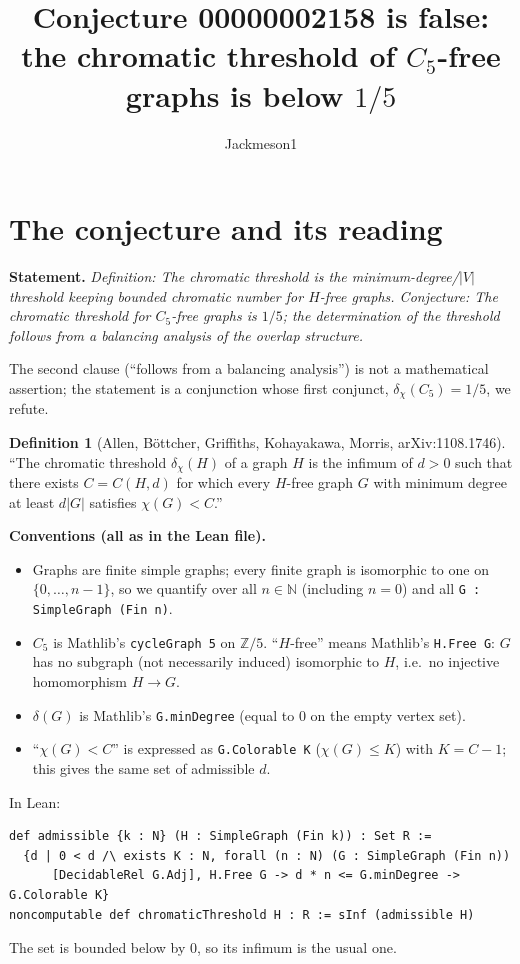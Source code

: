 \documentclass[11pt]{article}
\title{Conjecture 00000002158 is false:\\ the chromatic threshold of $C_5$-free graphs is below $1/5$}
\author{Jackmeson1}
\date{}
\theoremstyle{definition}
\newtheorem{definition}[theorem]{Definition}
\theoremstyle{remark}
\begin{document}
\maketitle

\section{The conjecture and its reading}

\textbf{Statement.} \emph{Definition: The chromatic threshold is the minimum-degree/$|V|$ threshold keeping bounded
chromatic number for $H$-free graphs. Conjecture: The chromatic threshold for $C_5$-free graphs is $1/5$; the
determination of the threshold follows from a balancing analysis of the overlap structure.}

The second clause (``follows from a balancing analysis'') is not a mathematical assertion; the statement is a
conjunction whose first conjunct, $\delta_\chi(C_5)=1/5$, we refute.

\begin{definition}[Allen, B\"ottcher, Griffiths, Kohayakawa, Morris, arXiv:1108.1746]
``The chromatic threshold $\delta_\chi(H)$ of a graph $H$ is the infimum of $d>0$ such that there exists $C=C(H,d)$
for which every $H$-free graph $G$ with minimum degree at least $d|G|$ satisfies $\chi(G)<C$.''
\end{definition}

\textbf{Conventions (all as in the Lean file).}
\begin{itemize}
\item Graphs are finite simple graphs; every finite graph is isomorphic to one on $\{0,\dots,n-1\}$, so we quantify
  over all $n\in\mathbb{N}$ (including $n=0$) and all \texttt{G : SimpleGraph (Fin n)}.
\item $C_5$ is Mathlib's \texttt{cycleGraph 5} on $\mathbb{Z}/5$. ``$H$-free'' means Mathlib's \texttt{H.Free G}:
  $G$ has no subgraph (not necessarily induced) isomorphic to $H$, i.e.\ no injective homomorphism $H\to G$.
\item $\delta(G)$ is Mathlib's \texttt{G.minDegree} (equal to $0$ on the empty vertex set).
\item ``$\chi(G)<C$'' is expressed as \texttt{G.Colorable K} ($\chi(G)\le K$) with $K=C-1$; this gives the same set
  of admissible $d$.
\end{itemize}
In Lean:
\begin{verbatim}
def admissible {k : N} (H : SimpleGraph (Fin k)) : Set R :=
  {d | 0 < d /\ exists K : N, forall (n : N) (G : SimpleGraph (Fin n))
      [DecidableRel G.Adj], H.Free G -> d * n <= G.minDegree -> G.Colorable K}
noncomputable def chromaticThreshold H : R := sInf (admissible H)
\end{verbatim}
The set is bounded below by $0$, so its infimum is the usual one.
\end{document}
